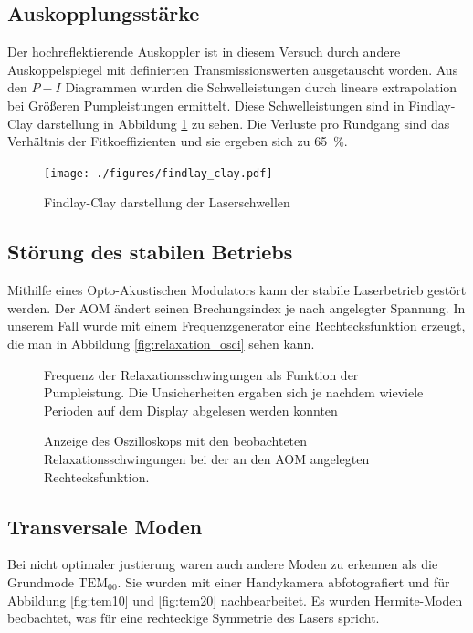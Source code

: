 \documentclass[11pt,twoside=true]{scrartcl}
\begin{document}
\subsection{Auskopplungsstärke}
Der hochreflektierende Auskoppler ist in diesem Versuch durch andere Auskoppelspiegel
mit definierten Transmissionswerten ausgetauscht worden. Aus den $P-I$  Diagrammen
wurden die Schwelleistungen durch lineare extrapolation bei Größeren Pumpleistungen
ermittelt. Diese Schwelleistungen sind in Findlay-Clay darstellung in Abbildung
\ref{fig:findlay_clay} zu sehen. Die Verluste pro Rundgang sind das Verhältnis
der Fitkoeffizienten und sie ergeben sich zu \SI{65}{\percent}. 
\begin{figure}[H]
  \centering
  \texttt{[image: ./figures/findlay\_clay.pdf]}
  \caption{Findlay-Clay darstellung der Laserschwellen}
  \label{fig:findlay_clay}
\end{figure}

\subsection{Störung des stabilen Betriebs}
Mithilfe eines Opto-Akustischen Modulators kann der stabile Laserbetrieb gestört
werden. Der AOM ändert seinen Brechungsindex je nach angelegter Spannung. In unserem 
Fall wurde mit einem Frequenzgenerator eine Rechtecksfunktion erzeugt, die man
in Abbildung \ref{fig:relaxation_osci} sehen kann.
\begin{figure}[H]
  \begin{floatrow}
     {
      \caption{Frequenz der Relaxationsschwingungen als Funktion der Pumpleistung. Die Unsicherheiten
      ergaben sich je nachdem wieviele Perioden auf dem Display abgelesen werden konnten}
    }
     {
      \caption{Anzeige des Oszilloskops mit den beobachteten Relaxationsschwingungen bei
      der an den AOM angelegten Rechtecksfunktion.}
    }
  \end{floatrow}
\end{figure}


\subsection{Transversale Moden}
Bei nicht optimaler justierung waren auch andere Moden zu erkennen als die 
Grundmode $\text{TEM}_{00}$. Sie wurden mit einer Handykamera abfotografiert und
für Abbildung \ref{fig:tem10} und \ref{fig:tem20} nachbearbeitet. Es wurden 
Hermite-Moden beobachtet, was für eine rechteckige Symmetrie des Lasers spricht. 
\end{document}
